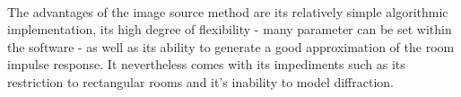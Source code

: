 \\The advantages of the image source method are its relatively simple algorithmic implementation, its high degree of flexibility - many parameter can be set within the software - as well as its ability to generate a good approximation of the room impulse response. It nevertheless comes with its impediments such as its restriction to rectangular rooms and it's inability to model diffraction.\cite{Samarasinghe2018}



